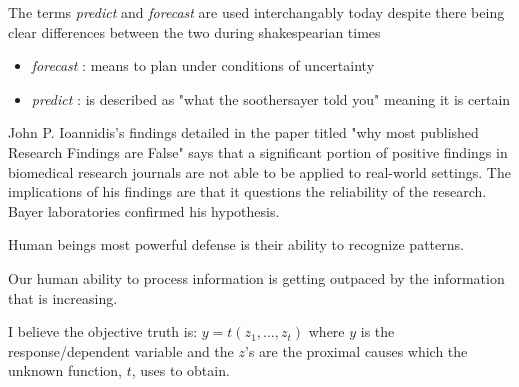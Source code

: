 \documentclass[12pt]{article}
\begin{document}

\begin{enumerate}


The terms \emph{predict} and \emph{forecast} are used interchangably today despite there being clear differences between the two during shakespearian times
\begin{itemize}
  \item \emph{forecast} : means to plan under conditions of uncertainty
  \item \emph{predict} : is described as "what the soothersayer told you" meaning it is certain
\end{itemize}


John P. Ioannidis's findings detailed in the paper titled "why most published Research Findings are False" says that a significant portion of positive findings in biomedical research journals are not able to be applied to real-world settings. The implications of his findings are that it questions the reliability of the research. Bayer laboratories confirmed his hypothesis.


Human beings most powerful defense is their ability to recognize patterns.


Our human ability to process information is getting outpaced by the information that is increasing.


I believe the objective truth is: $y = t(z_1, \ldots, z_t)$ where $y$ is the response/dependent variable and the $z$'s are the proximal causes which the unknown function, $t$, uses to obtain.


\end{enumerate}
\end{document}
